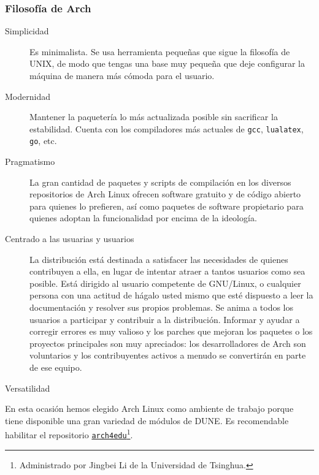 \documentclass[
	spanish,
	10pt,
	xcolor=table,
	handout,
	aspectratio=1610,
  ignorenonframetext
]{beamer}
\begin{document}
\begin{frame}
  \frametitle{Filosofía de Arch}

  \begin{description}
    \item[Simplicidad]
          Es minimalista.
          Se usa herramienta pequeñas que sigue la filosofía de UNIX, de modo que tengas una base muy pequeña que deje configurar la máquina de manera más cómoda para el usuario.
    \item[Modernidad]
          Mantener la paquetería lo más actualizada posible sin sacrificar la estabilidad. Cuenta con los compiladores más actuales de \lstinline{gcc}, \lstinline{lualatex}, \lstinline{go}, etc.
    \item[Pragmatismo]
          La gran cantidad de paquetes y scripts de compilación en los diversos repositorios de Arch Linux ofrecen software gratuito y de código abierto para quienes lo prefieren, así como paquetes de software propietario para quienes adoptan la funcionalidad por encima de la ideología.
    \item[Centrado a las usuarias y usuarios]
          La distribución está destinada a satisfacer las necesidades de quienes contribuyen a ella, en lugar de intentar atraer a tantos usuarios como sea posible.
          Está dirigido al usuario competente de GNU/Linux, o cualquier persona con una actitud de hágalo usted mismo que esté dispuesto a leer la documentación y resolver sus propios problemas.
          Se anima a todos los usuarios a participar y contribuir a la distribución.
          Informar y ayudar a corregir errores es muy valioso y los parches que mejoran los paquetes o los proyectos principales son muy apreciados: los desarrolladores de Arch son voluntarios y los contribuyentes activos a menudo se convertirán en parte de ese equipo.
    \item[Versatilidad]
  \end{description}

\end{frame}

\begin{frame}

  En esta ocasión hemos elegido Arch Linux como ambiente de trabajo porque tiene disponible una gran variedad de módulos de DUNE.
  Es recomendable habilitar el repositorio \href{https://wiki.archlinux.org/title/Unofficial\_user\_repositories\#arch4edu}{\texttt{arch4edu}}\footnote{Administrado por Jingbei Li de la Universidad de Tsinghua.}.
\end{frame}
\end{document}
